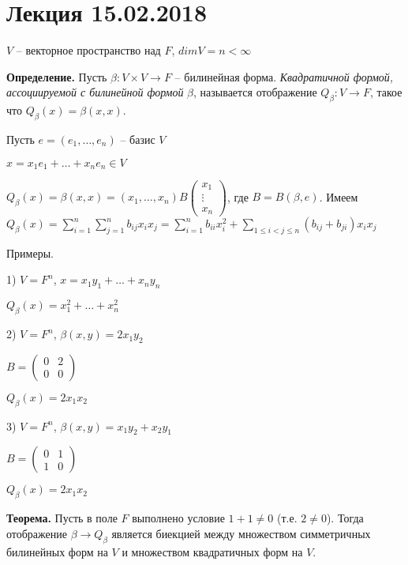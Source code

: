 \section{Лекция 15.02.2018}

$V$ -- векторное пространство над $F$, $dimV=n < \infty$

\vspace{\baselineskip}
\textbf{Определение.} Пусть $\beta: V \times V \rightarrow F$ -- билинейная форма. \textit{Квадратичной формой, ассоциируемой с билинейной формой} $\beta$, называется отображение $Q_\beta : V \rightarrow F$, такое что $Q_\beta(x) = \beta(x, x)$.

\vspace{\baselineskip}
Пусть $e = (e_1, \dots, e_n)$ -- базис $V$

$x = x_1 e_1 + \dots + x_n e_n \in V$

$Q_\beta(x) = \beta(x, x) = (x_1, \dots, x_n) B \begin{pmatrix} x_1 \\ \vdots \\ x_n \end {pmatrix}$, где $B = B(\beta, e)$. Имеем $Q_\beta(x) = \sum\limits_{i=1}^n \sum\limits_{j=1}^n b_{ij} x_i x_j = \sum\limits_{i=1}^n b_{ii} x_i^2 + \sum\limits_{1 \leq i < j \leq n} (b_{ij} + b_{ji}) x_i x_j$

\vspace{\baselineskip}
Примеры.

1) $V = F^n$, $x = x_1 y_1 + \dots + x_n y_n$

$Q_\beta(x) = x_1^2 + \dots + x_n^2$

2) $V = F^n$, $\beta(x, y) = 2x_1 y_2$

$B = \begin{pmatrix} 0 & 2 \\ 0 & 0 \end{pmatrix}$

$Q_\beta (x) = 2x_1 x_2$

3) $V = F^n$, $\beta(x, y) = x_1 y_2 + x_2 y_1$

$B = \begin{pmatrix} 0 & 1 \\ 1 & 0 \end{pmatrix}$

$Q_\beta(x) = 2x_1 x_2$

\vspace{\baselineskip}
\textbf{Теорема.} Пусть в поле $F$ выполнено условие $1+1 \neq 0$ (т.е. $2 \neq 0$). Тогда отображение $\beta \rightarrow Q_\beta$ является биекцией между множеством симметричных билинейных форм на $V$ и множеством квадратичных форм на $V$.

